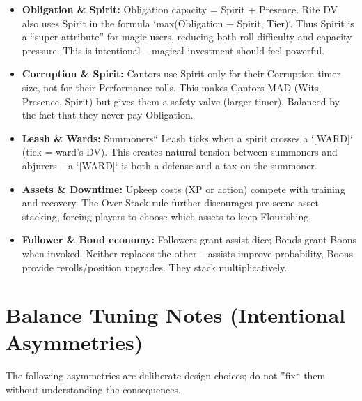 \documentclass[11pt]{article}
\begin{document}
\begin{itemize}
    \item \textbf{Obligation \& Spirit:} Obligation capacity = Spirit + Presence. Rite DV also uses Spirit in the formula `max(Obligation − Spirit, Tier)`. Thus Spirit is a ``super-attribute'' for magic users, reducing both roll difficulty and capacity pressure. This is intentional -- magical investment should feel powerful.
    \item \textbf{Corruption \& Spirit:} Cantors use Spirit only for their Corruption timer size, not for their Performance rolls. This makes Cantors MAD (Wits, Presence, Spirit) but gives them a safety valve (larger timer). Balanced by the fact that they never pay Obligation.
    \item \textbf{Leash \& Wards:} Summoners`` Leash ticks when a spirit crosses a `[WARD]` (tick = ward's DV). This creates natural tension between summoners and abjurers -- a `[WARD]` is both a defense and a tax on the summoner.
    \item \textbf{Assets \& Downtime:} Upkeep costs (XP or action) compete with training and recovery. The Over-Stack rule further discourages pre-scene asset stacking, forcing players to choose which assets to keep Flourishing.
    \item \textbf{Follower \& Bond economy:} Followers grant assist dice; Bonds grant Boons when invoked. Neither replaces the other -- assists improve probability, Boons provide rerolls/position upgrades. They stack multiplicatively.
\end{itemize}

\section{Balance Tuning Notes (Intentional Asymmetries)}
\label{sec:balance-notes}

The following asymmetries are deliberate design choices; do not ''fix`` them without understanding the consequences.
\end{document}
